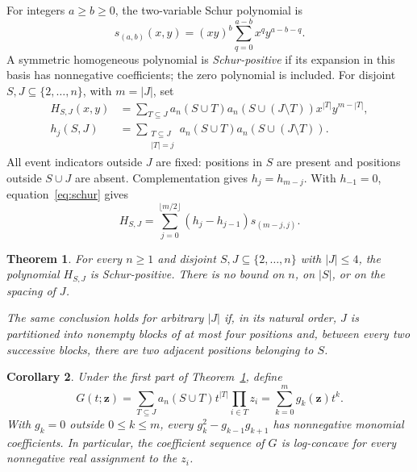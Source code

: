 \documentclass[11pt]{article}
\newtheorem{theorem}{Theorem}
\newtheorem{corollary}[theorem]{Corollary}
\begin{document}
For integers $a\ge b\ge0$, the two-variable Schur polynomial is
\begin{equation}\label{eq:schur}
 s_{(a,b)}(x,y)=(xy)^b\sum_{q=0}^{a-b}x^q y^{a-b-q}.
\end{equation}
A symmetric homogeneous polynomial is \emph{Schur-positive} if its expansion
in this basis has nonnegative coefficients; the zero polynomial is included.
For disjoint $S,J\subseteq\{2,\ldots,n\}$, with $m=|J|$, set
\begin{align}
 H_{S,J}(x,y)&=\sum_{T\subseteq J}a_n(S\cup T)
        a_n(S\cup(J\setminus T))x^{|T|}y^{m-|T|},\label{eq:H}\\
 h_j(S,J)&=\sum_{\substack{T\subseteq J\\|T|=j}}
       a_n(S\cup T)a_n(S\cup(J\setminus T)).\label{eq:h}
\end{align}
All event indicators outside $J$ are fixed: positions in $S$ are present
and positions outside $S\cup J$ are absent. Complementation gives
$h_j=h_{m-j}$. With $h_{-1}=0$, equation~\eqref{eq:schur} gives
\begin{equation}\label{eq:delta}
 H_{S,J}=\sum_{j=0}^{\lfloor m/2\rfloor}
       (h_j-h_{j-1})s_{(m-j,j)}.
\end{equation}

\begin{theorem}\label{thm:main}
For every $n\ge1$ and disjoint $S,J\subseteq\{2,\ldots,n\}$ with
$|J|\le4$, the polynomial $H_{S,J}$ is Schur-positive. There is no bound
on $n$, on $|S|$, or on the spacing of $J$.

The same conclusion holds for arbitrary $|J|$ if, in its natural order,
$J$ is partitioned into nonempty blocks of at most four positions and,
between every two successive blocks, there are two adjacent positions
belonging to $S$.
\end{theorem}

\begin{corollary}\label{cor:lc}
Under the first part of Theorem~\ref{thm:main}, define
\begin{equation}\label{eq:G}
 G(t;\boldsymbol z)=\sum_{T\subseteq J}a_n(S\cup T)t^{|T|}
              \prod_{i\in T}z_i=\sum_{k=0}^m g_k(\boldsymbol z)t^k.
\end{equation}
With $g_k=0$ outside $0\le k\le m$, every
$g_k^2-g_{k-1}g_{k+1}$ has nonnegative monomial coefficients.
In particular, the coefficient sequence of $G$ is log-concave for every
nonnegative real assignment to the $z_i$.
\end{corollary}
\end{document}
